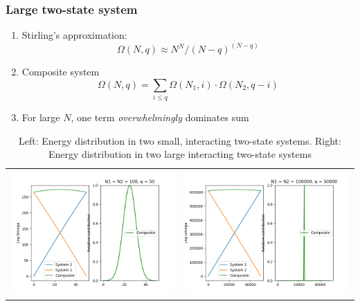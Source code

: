 \documentclass[11pt]{article}
\begin{document}
\subsubsection{Large two-state system}
\label{sec:org8d232d6}
\begin{enumerate}
\item Stirling's approximation:
\[\Omega(N,q) \approx N^N/(N-q)^{(N-q)}\]
\item Composite system
\[\Omega(N,q) = \sum_{i\le q} \Omega(N_1,i)\cdot \Omega(N_2,q-i) \]
\item For large \(N\), one term \emph{overwhelmingly} dominates sum
\end{enumerate}
\begin{table}
   \caption{Left: Energy distribution in two small, interacting two-state systems.  Right: Energy distribution in two large interacting two-state systems}
\begin{tabular}{cc}
\includegraphics[scale=0.5]{Images/2state-100.png} & \includegraphics[scale=0.5]{Images/2state-100000.png}
\end{tabular}
\end{table}
\end{document}
